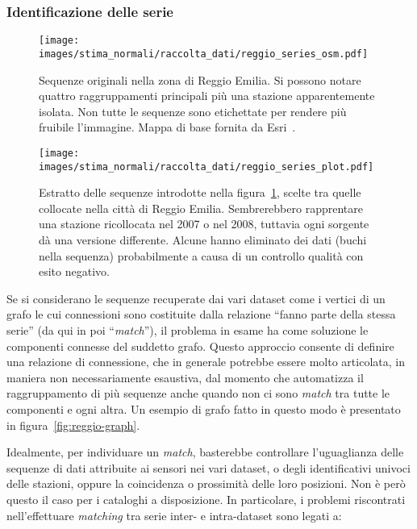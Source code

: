 \subsubsection{Identificazione delle serie}
\begin{figure}[ht]
  \centering
  \texttt{[image: images/stima\_normali/raccolta\_dati/reggio\_series\_osm.pdf]}
  \caption{Sequenze originali nella zona di Reggio Emilia. Si possono notare quattro raggruppamenti principali più una stazione apparentemente isolata. Non tutte le sequenze sono etichettate per rendere più fruibile l'immagine. Mappa di base fornita da Esri~\autocite{esriWorldTopographicMap2013}.}\label{fig:reggio-osm}
\end{figure}
\begin{figure}[ht]
  \centering
  \texttt{[image: images/stima\_normali/raccolta\_dati/reggio\_series\_plot.pdf]}
  \caption{Estratto delle sequenze introdotte nella figura~\ref{fig:reggio-osm}, scelte tra quelle collocate nella città di Reggio Emilia. Sembrerebbero rapprentare una stazione ricollocata nel 2007 o nel 2008, tuttavia ogni sorgente dà una versione differente. Alcune hanno eliminato dei dati (buchi nella sequenza) probabilmente a causa di un controllo qualità con esito negativo.}\label{fig:reggio-plot}
\end{figure}
Se si considerano le sequenze recuperate dai vari dataset come i vertici di un grafo le cui connessioni sono costituite dalla relazione ``fanno parte della stessa serie'' (da qui in poi ``\emph{match}''), il problema in esame ha come soluzione le componenti connesse del suddetto grafo. Questo approccio consente di definire una relazione di connessione, che in generale potrebbe essere molto articolata, in maniera non necessariamente esaustiva, dal momento che automatizza il raggruppamento di più sequenze anche quando non ci sono \emph{match} tra tutte le componenti e ogni altra. Un esempio di grafo fatto in questo modo è presentato in figura~\ref{fig:reggio-graph}.

Idealmente, per individuare un \emph{match}, basterebbe controllare l'uguaglianza delle sequenze di dati attribuite ai sensori nei vari dataset, o degli identificativi univoci delle stazioni, oppure la coincidenza o prossimità delle loro posizioni. Non è però questo il caso per i cataloghi a disposizione. In particolare, i problemi riscontrati nell'effettuare \emph{matching} tra serie inter- e intra-dataset sono legati a:

